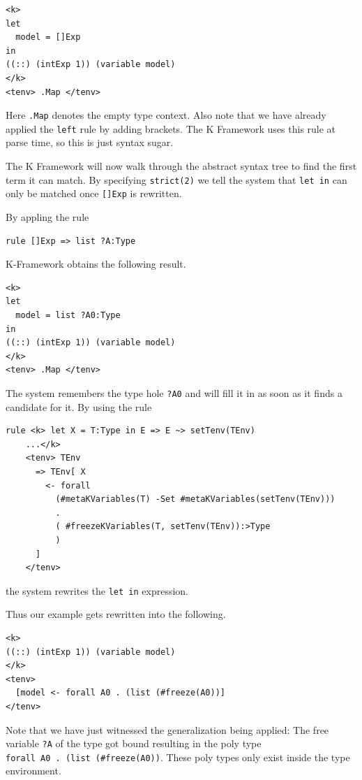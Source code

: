 \documentclass[]{scrbook}
\theoremstyle{definition}
\theoremstyle{definition}
\theoremstyle{definition}
\theoremstyle{remark}
\begin{document}
\begin{verbatim}
<k>
let
  model = []Exp
in
((::) (intExp 1)) (variable model)
</k>
<tenv> .Map </tenv>
\end{verbatim}

Here \texttt{.Map} denotes the empty type context. Also note that we
have already applied the \texttt{left} rule by adding brackets. The K
Framework uses this rule at parse time, so this is just syntax sugar.

The K Framework will now walk through the abstract syntax tree to find
the first term it can match. By specifying \texttt{strict(2)} we tell
the system that \texttt{let\ in} can only be matched once
\texttt{{[}{]}Exp} is rewritten.

By appling the rule

\begin{verbatim}
rule []Exp => list ?A:Type
\end{verbatim}

K-Framework obtains the following result.

\begin{verbatim}
<k>
let
  model = list ?A0:Type
in
((::) (intExp 1)) (variable model)
</k>
<tenv> .Map </tenv>
\end{verbatim}

The system remembers the type hole \texttt{?A0} and will fill it in as
soon as it finds a candidate for it. By using the rule

\begin{verbatim}
rule <k> let X = T:Type in E => E ~> setTenv(TEnv) 
    ...</k>
    <tenv> TEnv 
      => TEnv[ X 
        <- forall 
          (#metaKVariables(T) -Set #metaKVariables(setTenv(TEnv)))
          . 
          ( #freezeKVariables(T, setTenv(TEnv)):>Type
          )
      ]
    </tenv>
\end{verbatim}

the system rewrites the \texttt{let\ in} expression.

Thus our example gets rewritten into the following.

\begin{verbatim}
<k>
((::) (intExp 1)) (variable model)
</k>
<tenv>
  [model <- forall A0 . (list (#freeze(A0))]
</tenv>
\end{verbatim}

Note that we have just witnessed the generalization being applied: The
free variable \texttt{?A} of the type got bound resulting in the poly
type \texttt{forall\ A0\ .\ (list\ (\#freeze(A0))}. These poly types
only exist inside the type environment.
\end{document}
